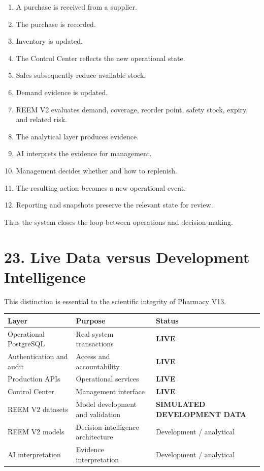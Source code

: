 \documentclass[12pt,a4paper]{article}
\newcommand{\live}{\textcolor{steel}{\textbf{LIVE}}}
\newcommand{\simulated}{\textcolor{slate}{\textbf{SIMULATED DEVELOPMENT DATA}}}
\begin{document}
\begin{enumerate}[leftmargin=1cm]
\item A purchase is received from a supplier.
\item The purchase is recorded.
\item Inventory is updated.
\item The Control Center reflects the new operational state.
\item Sales subsequently reduce available stock.
\item Demand evidence is updated.
\item REEM V2 evaluates demand, coverage, reorder point, safety stock, expiry, and related risk.
\item The analytical layer produces evidence.
\item AI interprets the evidence for management.
\item Management decides whether and how to replenish.
\item The resulting action becomes a new operational event.
\item Reporting and snapshots preserve the relevant state for review.
\end{enumerate}

Thus the system closes the loop between operations and decision-making.

\section*{23. Live Data versus Development Intelligence}

This distinction is essential to the scientific integrity of Pharmacy V13.

\begin{center}
\begin{tabularx}{0.92\textwidth}{lXX}
\toprule
\textbf{Layer} & \textbf{Purpose} & \textbf{Status}\\
\midrule
Operational PostgreSQL & Real system transactions & \live\\
Authentication and audit & Access and accountability & \live\\
Production APIs & Operational services & \live\\
Control Center & Management interface & \live\\
REEM V2 datasets & Model development and validation & \simulated\\
REEM V2 models & Decision-intelligence architecture & Development / analytical\\
AI interpretation & Evidence interpretation & Development / analytical\\
\bottomrule
\end{tabularx}
\end{center}
\end{document}
